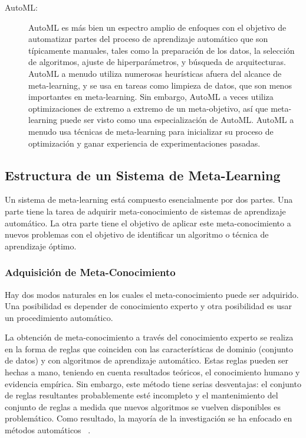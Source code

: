\begin{description}
	\item[AutoML:] AutoML es más bien un espectro amplio de enfoques con el
    objetivo de automatizar partes del proceso de aprendizaje automático que
    son típicamente manuales, tales como la preparación de los datos, la
    selección de algoritmos, ajuste de hiperparámetros, y búsqueda de
    arquitecturas. AutoML a menudo utiliza numerosas heurísticas afuera del
    alcance de meta-learning, y se usa en tareas como limpieza de datos, que
    son menos importantes en meta-learning. Sin embargo, AutoML a veces
    utiliza optimizaciones de extremo a extremo de un meta-objetivo, así que
    meta-learning puede ser visto como una especialización de AutoML. AutoML
    a menudo usa técnicas de meta-learning para inicializar su proceso de
    optimización y ganar experiencia de experimentaciones pasadas.
\end{description}

\subsection{Estructura de un Sistema de Meta-Learning}

Un sistema de meta-learning está compuesto esencialmente por dos partes. Una
parte tiene la tarea de adquirir meta-conocimiento de sistemas de aprendizaje
automático. La otra parte tiene el objetivo de aplicar este meta-conocimiento
a nuevos problemas con el objetivo de identificar un algoritmo o técnica de
aprendizaje óptimo.

\subsubsection{Adquisición de Meta-Conocimiento} 

Hay dos modos naturales en los cuales el meta-conocimiento puede ser adquirido.
Una posibilidad es depender de conocimiento experto y otra posibilidad es usar
un procedimiento automático. 

La obtención de meta-conocimiento a través del conocimiento experto se realiza
en la forma de reglas que coinciden con las características de dominio
(conjunto de datos) y con algoritmos de aprendizaje automático. Estas reglas
pueden ser hechas a mano, teniendo en cuenta resultados teóricos, el
conocimiento humano y evidencia empírica. Sin embargo, este método tiene serias
desventajas: el conjunto de reglas resultantes probablemente esté incompleto y
el mantenimiento del conjunto de reglas a medida que nuevos algoritmos se
vuelven disponibles es problemático. Como resultado, la mayoría de la
investigación se ha enfocado en métodos automáticos
~\cite{bradzil2017metalearning}.
	
